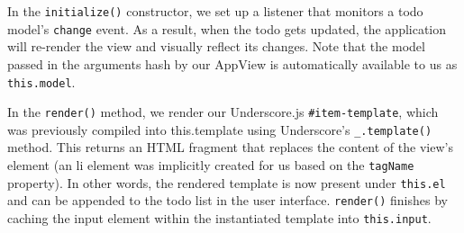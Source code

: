 \documentclass[9pt]{book}
\newenvironment{Shaded}{}{}
\newcommand{\KeywordTok}[1]{\textcolor[rgb]{0.00,0.44,0.13}{\textbf{{#1}}}}
\newcommand{\DataTypeTok}[1]{\textcolor[rgb]{0.56,0.13,0.00}{{#1}}}
\newcommand{\StringTok}[1]{\textcolor[rgb]{0.25,0.44,0.63}{{#1}}}
\newcommand{\CommentTok}[1]{\textcolor[rgb]{0.38,0.63,0.69}{\textit{{#1}}}}
\newcommand{\OtherTok}[1]{\textcolor[rgb]{0.00,0.44,0.13}{{#1}}}
\newcommand{\FunctionTok}[1]{\textcolor[rgb]{0.02,0.16,0.49}{{#1}}}
\newcommand{\NormalTok}[1]{{#1}}
\begin{document}
\begin{Shaded}
\end{Shaded}

In the \texttt{initialize()} constructor, we set up a listener that
monitors a todo model's \texttt{change} event. As a result, when the
todo gets updated, the application will re-render the view and visually
reflect its changes. Note that the model passed in the arguments hash by
our AppView is automatically available to us as \texttt{this.model}.

In the \texttt{render()} method, we render our Underscore.js
\texttt{\#item-template}, which was previously compiled into
this.template using Underscore's \texttt{\_.template()} method. This
returns an HTML fragment that replaces the content of the view's element
(an li element was implicitly created for us based on the
\texttt{tagName} property). In other words, the rendered template is now
present under \texttt{this.el} and can be appended to the todo list in
the user interface. \texttt{render()} finishes by caching the input
element within the instantiated template into \texttt{this.input}.
\end{document}
